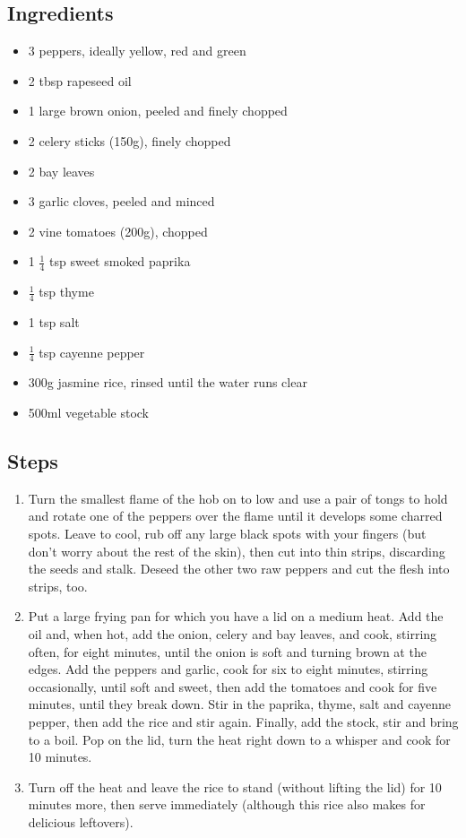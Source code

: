 \documentclass{book}
\begin{document}
\subsection*{Ingredients}
\begin{itemize}
\item 3 peppers, ideally yellow, red and green
\item 2 tbsp rapeseed oil 
\item 1 large brown onion, peeled and finely chopped 
\item 2 celery sticks (150g), finely chopped 
\item 2 bay leaves 
\item 3 garlic cloves, peeled and minced 
\item 2 vine tomatoes (200g), chopped 
\item 1 $\frac{1}{4}$ tsp sweet smoked paprika 
\item $\frac{1}{4}$ tsp thyme
\item 1 tsp salt 
\item $\frac{1}{4}$ tsp cayenne pepper
\item 300g jasmine rice, rinsed until the water runs clear
\item 500ml vegetable stock
\end{itemize}

\subsection*{Steps}
\begin{enumerate}
\item Turn the smallest flame of the hob on to low and use a pair of tongs to hold and rotate one of the peppers over the flame until it develops some charred spots. Leave to cool, rub off any large black spots with your fingers (but don’t worry about the rest of the skin), then cut into thin strips, discarding the seeds and stalk. Deseed the other two raw peppers and cut the flesh into strips, too.
\item Put a large frying pan for which you have a lid on a medium heat. Add the oil and, when hot, add the onion, celery and bay leaves, and cook, stirring often, for eight minutes, until the onion is soft and turning brown at the edges. Add the peppers and garlic, cook for six to eight minutes, stirring occasionally, until soft and sweet, then add the tomatoes and cook for five minutes, until they break down. Stir in the paprika, thyme, salt and cayenne pepper, then add the rice and stir again. Finally, add the stock, stir and bring to a boil. Pop on the lid, turn the heat right down to a whisper and cook for 10 minutes.
\item Turn off the heat and leave the rice to stand (without lifting the lid) for 10 minutes more, then serve immediately (although this rice also makes for delicious leftovers).
\end{enumerate}
\newpage
\end{document}
